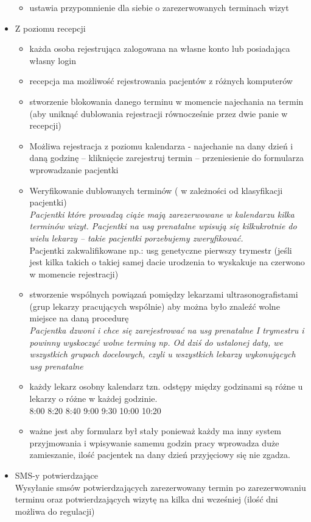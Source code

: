 \documentclass[polish,12pt]{aghthesis}
\begin{document}
\begin{itemize}
\begin{itemize}
      \item ustawia przypomnienie dla siebie o zarezerwowanych terminach wizyt
    \end{itemize}
    \item Z poziomu recepcji \begin{itemize}
        \item każda osoba rejestrująca zalogowana na własne konto lub posiadająca własny login
        \item recepcja ma możliwość rejestrowania pacjentów z różnych komputerów
        \item stworzenie blokowania danego terminu w momencie najechania na termin (aby uniknąć dublowania rejestracji równocześnie przez dwie panie w recepcji)
        \item Możliwa rejestracja z poziomu kalendarza  - najechanie na dany dzień i daną godzinę – kliknięcie zarejestruj termin – przeniesienie do formularza wprowadzanie pacjentki
        \item Weryfikowanie dublowanych terminów  ( w zależności od klasyfikacji pacjentki)  \\
        \emph{Pacjentki które prowadzą ciąże mają zarezerwowane w kalendarzu kilka terminów wizyt. Pacjentki na usg prenatalne wpisują się kilkukrotnie do wielu lekarzy – takie pacjentki porzebujemy zweryfikować.} \\
        Pacjentki zakwalifikowane np.: usg genetyczne pierwszy trymestr (jeśli jest kilka takich o takiej samej dacie urodzenia to wyskakuje na czerwono w momencie rejestracji)
        \item stworzenie wspólnych powiązań pomiędzy lekarzami ultrasonografistami (grup lekarzy pracujących wspólnie) aby można było znaleźć wolne miejsce na daną procedurę \\
        \emph{Pacjentka dzwoni i chce się zarejestrować na usg prenatalne I trymestru i powinny wyskoczyć wolne terminy np. Od dziś do ustalonej daty, we wszystkich grupach docelowych, czyli u wszystkich lekarzy wykonujących usg prenatalne}
        \item każdy lekarz osobny kalendarz  tzn. odstępy między godzinami są różne u lekarzy o różne w każdej godzinie. \\
        8:00 8:20 8:40 9:00  9:30 10:00 10:20
        \item ważne jest aby formularz był stały ponieważ każdy ma inny system przyjmowania i wpisywanie samemu godzin pracy wprowadza duże zamieszanie, ilość pacjentek na dany dzień przyjęciowy się nie zgadza. 
    \end{itemize}
    \item SMS-y potwierdzające \\
    Wysyłanie smsów potwierdzających zarezerwowany termin po zarezerwowaniu terminu oraz potwierdzających wizytę na kilka dni wcześniej (ilość dni możliwa do regulacji) 
\end{itemize} 
 
\end{document}
